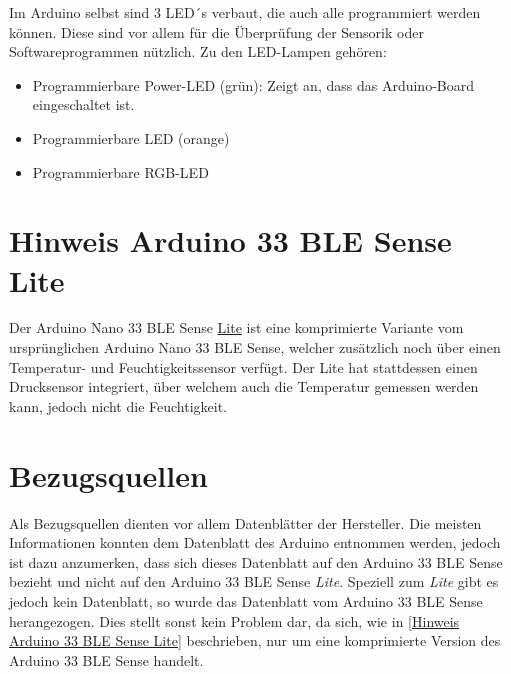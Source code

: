 Im Arduino selbst sind 3 LED´s verbaut, die auch alle programmiert werden können. Diese sind vor allem für die Überprüfung der Sensorik oder Softwareprogrammen nützlich. Zu den LED-Lampen gehören: 
	\begin{itemize}
		\item Programmierbare Power-LED (grün): Zeigt an, dass das Arduino-Board eingeschaltet ist.
		\item Programmierbare LED (orange)
		\item Programmierbare RGB-LED
		\\ \cite{Ard.2024}
	\end{itemize}

\section{Hinweis Arduino 33 BLE Sense Lite \label{Hinweis Arduino 33 BLE Sense Lite}}

Der Arduino Nano 33 BLE Sense \underline{Lite} ist eine komprimierte Variante vom ursprünglichen Arduino Nano 33 BLE Sense, welcher zusätzlich noch über einen Temperatur- und Feuchtigkeitssensor verfügt. Der Lite hat stattdessen einen Drucksensor integriert, über welchem auch die Temperatur gemessen werden kann, jedoch nicht die Feuchtigkeit.\cite{PetrFilipi.2022}

\section{Bezugsquellen}

Als Bezugsquellen dienten vor allem Datenblätter der Hersteller. Die meisten Informationen konnten dem Datenblatt des Arduino entnommen werden, jedoch ist dazu anzumerken, dass sich dieses Datenblatt auf den Arduino 33 BLE Sense bezieht und nicht auf den Arduino 33 BLE Sense \emph{Lite}. Speziell zum \emph{Lite} gibt es jedoch kein Datenblatt, so wurde das Datenblatt vom Arduino 33 BLE Sense herangezogen. Dies stellt sonst kein Problem dar, da sich, wie in \ref{Hinweis Arduino 33 BLE Sense Lite} beschrieben, nur um eine komprimierte Version des Arduino 33 BLE Sense handelt.


